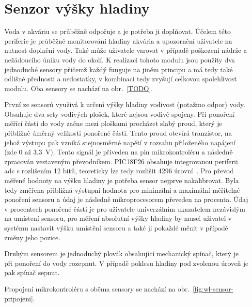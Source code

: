 \section{Senzor výšky hladiny}
\label{sec:perif-sensor-hladina}
    Voda v akváriu se průběžně odpořuje a je potřeba ji doplňovat. Účelem této periferie je průběžné monitorování hladiny akvária a upozornění uživatele na nutnost doplnění vody. Také může uživatele varovat v případě poškození nádrže a nežádoucího úniku vody do okolí. 
    K realizaci tohoto modulu jsou použity dva jednoduché sensory přičemž každý funguje na jiném principu a má tedy také odlišné přednosti a nedostatky, v kombinaci tedy zvyšují celkovou spolehlivost modulu. Oba sensory se nachází na obr.~\ref{TODO}. 

    První ze sensorů využivá k určení výšky hladiny vodivost (potažmo odpor) vody. Obsahuje dva sety vodivých plošek, které nejsou vodivě spojeny. Při ponoření měřící části do vody začne mezi ploškami procházet slabý proud, který je přibližně úměrný velikosti ponořené části. Tento proud otevírá tranzistor, na jehož výstupu pak vzniká stejnosměrné napětí v rozsahu přiloženého napájení (zde 0 až \qty{3.3}{V}). Tento signál je přiveden na pin mikrokontroléru a následně zpracován vestaveným převodníkem. PIC18F26 obsahuje integrovanou periferii \acs{adc} s rozlišením 12 bitů, teoreticky lze tedy rozlišit \num{4296} úrovní~\cite{PIC18F26Q83}. Pro převod měřené hodnoty na výšku hladiny je potřeba sensor nejprve nakalibrovat. Byla tedy změřena přibližná výstupní hodnota pro minimální a maximální měřitelné ponoření sensoru a údaj je následně mikroprocesorem převeden na procenta. Údaj v procentech ponořené části je pro uživatele univerzálním ukazatelem nezávislým na umístení sensoru, pro měření absolutní výšky hladiny by musel uživatel v systému nastavit výšku umístění sensoru a také ji pokaždé měnit v případě změny jeho pozice.

    Druhým sensorem je jednoduchý plovák obsahující mechanický spínač, který je při ponoření do vody rozepnut. V případě poklesu hladiny pod zvolenou úroveň je pak spínač sepnut.

    Propojení mikrokontroléru s oběma sensory se nachází na obr.~\ref{fig:wl-sensor-pripojeni}.

